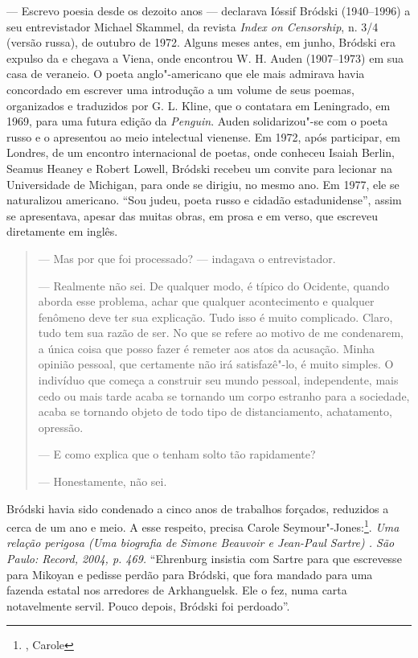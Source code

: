 {--- Escrevo poesia desde os dezoito anos --- declarava Ióssif Bródski
(1940--1996) a seu entrevistador Michael Skammel, da revista \emph{Index
on Censorship}, n. 3/4 (versão russa), de outubro de 1972. Alguns meses
antes, em junho, Bródski era expulso da  e chegava a Viena, onde
encontrou W. H. Auden (1907--1973) em sua casa de veraneio. O poeta
anglo"-americano que ele mais admirava havia concordado em escrever
uma introdução a um volume de seus poemas, organizados e traduzidos por
G. L. Kline, que o contatara em Leningrado, em 1969, para uma
futura edição da \emph{Penguin}. Auden solidarizou"-se com o poeta russo e o apresentou ao
meio intelectual vienense. Em 1972, após participar, em Londres, de um
encontro internacional de poetas, onde conheceu Isaiah Berlin, Seamus
Heaney e Robert Lowell, Bródski recebeu um convite para lecionar na
Universidade de Michigan, para onde se dirigiu, no mesmo ano. Em
1977, ele se naturalizou americano. ``Sou judeu, poeta russo e cidadão
estadunidense'', assim se apresentava, apesar das muitas obras, em
prosa e em verso, que escreveu diretamente em inglês.

\begin{quote}
--- Mas por que foi processado? --- indagava o entrevistador.

--- Realmente não sei. De qualquer modo, é típico do Ocidente, quando
aborda esse problema, achar que qualquer acontecimento e qualquer
fenômeno deve ter sua explicação. Tudo isso é muito complicado. Claro,
tudo tem sua razão de ser. No que se refere ao motivo de me condenarem, a
única coisa que posso fazer é remeter aos atos da acusação. Minha
opinião pessoal, que certamente não irá satisfazê"-lo, é muito simples. O
indivíduo que começa a construir seu mundo pessoal, independente, mais
cedo ou mais tarde acaba se tornando um corpo estranho para a sociedade,
acaba se tornando objeto de todo tipo de distanciamento, achatamento,
opressão.

--- E como explica que o tenham solto tão rapidamente?

--- Honestamente, não sei.
\end{quote}

Bródski havia sido condenado a cinco anos de trabalhos forçados,
reduzidos a cerca de um ano e meio. A esse respeito, precisa Carole
Seymour"-Jones:\footnote{, Carole}. \emph{Uma
 relação perigosa (Uma biografia de Simone Beauvoir e Jean-Paul Sartre)
. São Paulo: Record, 2004, p. 469.} ``Ehrenburg
insistia com Sartre para que escrevesse para Mikoyan e pedisse perdão
para Bródski, que fora mandado para uma fazenda estatal nos arredores de
Arkhanguelsk. Ele o fez, numa carta notavelmente servil. Pouco depois,
Bródski foi perdoado''.

}

